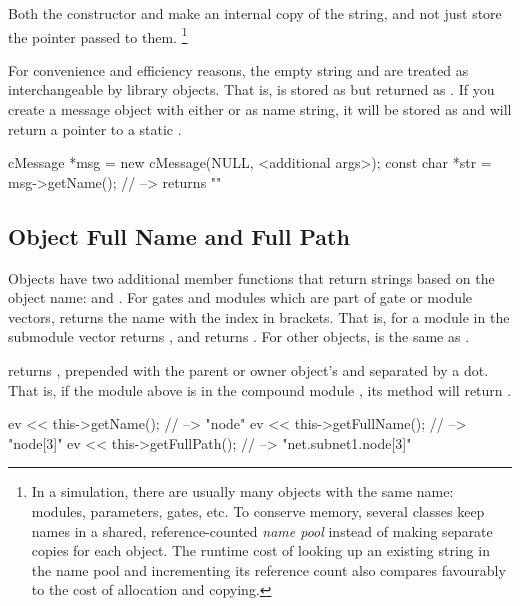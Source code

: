 Both the constructor and  make an internal copy of the string,
and not just store the pointer passed to them.
  \footnote{In a simulation, there are usually many objects with the same name:
  modules, parameters, gates, etc. To conserve memory, several classes
  keep names in a shared, reference-counted \textit{name pool} instead of
  making separate copies for each object. The runtime cost of looking up an
  existing string in the name pool and incrementing its reference count
  also compares favourably to the cost of allocation and copying.}

For convenience and efficiency reasons, the empty string 
and  are treated as interchangeable by library objects.
That is,  is stored as  but returned as .
If you create a message object with either 
or  as name string, it will be stored as 
and  will return a pointer to a static .

\begin{cpp}
cMessage *msg = new cMessage(NULL, <additional args>);
const char *str = msg->getName(); // --> returns ""
\end{cpp}


\subsection{Object Full Name and Full Path}
\label{sec:sim-lib:fullname-and-fullpath}


Objects have two additional member functions that return strings
based on the object name:  and .
For gates and modules which are part of gate or module vectors,
 returns the name with the index in brackets.
That is, for a module  in the submodule vector 
 returns , and  returns .
For other objects,  is the same as .

 returns , prepended with the
parent or owner object's  and separated by a dot.
That is, if the  module above is in the compound module
, its  method will return
.

\begin{cpp}
ev << this->getName();     // --> "node"
ev << this->getFullName(); // --> "node[3]"
ev << this->getFullPath(); // --> "net.subnet1.node[3]"
\end{cpp}


